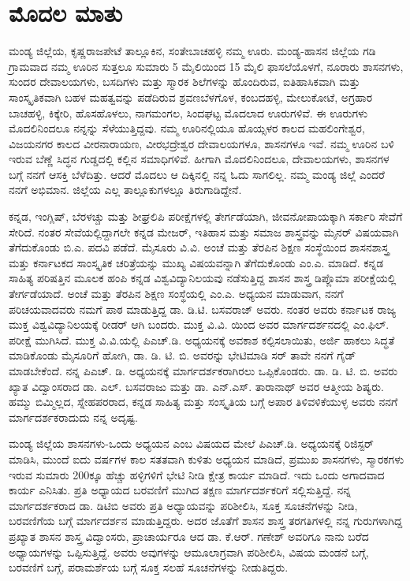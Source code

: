 
\chapter*{ಮೊದಲ ಮಾತು}

ಮಂಡ್ಯ ಜಿಲ್ಲೆಯ, ಕೃಷ್ಣರಾಜಪೇಟೆ ತಾಲ್ಲೂಕಿನ, ಸಂತೇಬಾಚಹಳ್ಳಿ ನಮ್ಮ ಊರು. ಮಂಡ್ಯ-ಹಾಸನ ಜಿಲ್ಲೆಯ ಗಡಿ ಗ್ರಾಮವಾದ ನಮ್ಮ ಊರಿನ ಸುತ್ತಲೂ ಸುಮಾರು 5 ಮೈಲಿಯಿಂದ 15 ಮೈಲಿ ಫಾಸಲೆಯೊಳಗೆ, ನೂರಾರು ಶಾಸನಗಳು, ಸುಂದರ ದೇವಾಲಯಗಳು, ಬಸದಿಗಳು ಮತ್ತು ಸ್ಮಾರಕ ಶಿಲೆಗಳನ್ನು ಹೊಂದಿರುವ, ಐತಿಹಾಸಿಕವಾಗಿ ಮತ್ತು ಸಾಂಸ್ಕೃತಿಕವಾಗಿ ಬಹಳ ಮಹತ್ವವನ್ನು ಪಡೆದಿರುವ ಶ್ರವಣಬೆಳಗೊಳ, ಕಂಬದಹಳ್ಳಿ, ಮೇಲುಕೋಟೆ, ಅಗ್ರಹಾರ ಬಾಚಹಳ್ಳಿ, ಕಿಕ್ಕೇರಿ, ಹೊಸಹೊಳಲು, ನಾಗಮಂಗಲ, ಸಿಂದಘಟ್ಟ ಮೊದಲಾದ ಊರುಗಳಿವೆ. ಈ ಊರುಗಳು ಮೊದಲಿನಿಂದಲೂ ನನ್ನನ್ನು ಸೆಳೆಯುತ್ತಿದ್ದವು. ನಮ್ಮ ಊರಿನಲ್ಲಿಯೂ ಹೊಯ್ಸಳರ ಕಾಲದ ಮಹಲಿಂಗೇಶ್ವರ, ವಿಜಯನಗರ ಕಾಲದ ವೀರನಾರಾಯಣ, ವೀರಭದ್ರೇಶ್ವರ ದೇವಾಲಯಗಳೂ, ಶಾಸನಗಳೂ ಇವೆ. ನಮ್ಮ ಊರಿನ ಬಳಿ ಇರುವ ಬೆಣ್ಣೆ ಸಿದ್ಧನ ಗುಡ್ಡದಲ್ಲಿ ಕಲ್ಲಿನ ಸಮಾಧಿಗಳಿವೆ. ಹೀಗಾಗಿ ಮೊದಲಿನಿಂದಲೂ, ದೇವಾಲಯಗಳು, ಶಾಸನಗಳ ಬಗ್ಗೆ ನನಗೆ ಆಸಕ್ತಿ ಬೆಳೆದಿತ್ತು. ಆದರೆ ಮೊದಲು ಆ ದಿಕ್ಕಿನಲ್ಲಿ ನನ್ನ ಓದು ಸಾಗಲಿಲ್ಲ. ನಮ್ಮ ಮಂಡ್ಯ ಜಿಲ್ಲೆ ಎಂದರೆ ನನಗೆ ಅಭಿಮಾನ. ಜಿಲ್ಲೆಯ ಎಲ್ಲ ತಾಲ್ಲೂಕುಗಳಲ್ಲೂ ತಿರುಗಾಡಿದ್ದೇನೆ.

ಕನ್ನಡ, ಇಂಗ್ಲಿಷ್​, ಬೆರಳಚ್ಚು ಮತ್ತು ಶೀಘ್ರಲಿಪಿ ಪರೀಕ್ಷೆಗಳಲ್ಲಿ ತೇರ್ಗಡೆಯಾಗಿ, ಜೀವನೋಪಾಯಕ್ಕಾಗಿ ಸರ್ಕಾರಿ ಸೇವೆಗೆ ಸೇರಿದೆ. ನಂತರ ಸೇವೆಯಲ್ಲಿದ್ದಾಗಲೇ ಕನ್ನಡ ಮೇಜರ್​, ಇತಿಹಾಸ ಮತ್ತು ಸಮಾಜ ಶಾಸ್ತ್ರವನ್ನು ಮೈನರ್​ ವಿಷಯವಾಗಿ ತೆಗೆದುಕೊಂಡು ಬಿ.ಎ. ಪದವಿ ಪಡೆದೆ. ಮೈಸೂರು ವಿ.ವಿ. ಅಂಚೆ ಮತ್ತು ತೆರಪಿನ ಶಿಕ್ಷಣ ಸಂಸ್ಥೆಯಿಂದ ಶಾಸನಶಾಸ್ತ್ರ ಮತ್ತು ಕರ್ನಾಟಕದ ಸಾಂಸ್ಕೃತಿಕ ಚರಿತ್ರೆಯನ್ನು ಮುಖ್ಯ ವಿಷಯವನ್ನಾಗಿ ತೆಗೆದುಕೊಂಡು ಎಂ.ಎ. ಮಾಡಿದೆ. ಕನ್ನಡ ಸಾಹಿತ್ಯ ಪರಿಷತ್ತಿನ ಮೂಲಕ ಹಂಪಿ ಕನ್ನಡ ವಿಶ್ವವಿದ್ಯಾನಿಲಯವು ನಡೆಸುತ್ತಿದ್ದ ಶಾಸನ ಶಾಸ್ತ್ರ ಡಿಪ್ಲೊಮಾ ಪರೀಕ್ಷೆಯಲ್ಲಿ ತೇರ್ಗಡೆಯಾದೆ. ಅಂಚೆ ಮತ್ತು ತೆರಪಿನ ಶಿಕ್ಷಣ ಸಂಸ್ಥೆಯಲ್ಲಿ ಎಂ.ಎ. ಅಧ್ಯಯನ ಮಾಡುವಾಗ, ನನಗೆ ಪರಿಚಯವಾದವರು ನಮಗೆ ಪಾಠ ಮಾಡುತ್ತಿದ್ದ ಡಾ. ಡಿ.ಟಿ. ಬಸವರಾಜ್​ ಅವರು. ನಂತರ ಅವರು ಕರ್ನಾಟಕ ರಾಜ್ಯ ಮುಕ್ತ ವಿಶ್ವವಿದ್ಯಾನಿಲಯಕ್ಕೆ ರೀಡರ್​ ಆಗಿ ಬಂದರು. ಮುಕ್ತ ವಿ.ವಿ. ಯಿಂದ ಅವರ ಮಾರ್ಗದರ್ಶನದಲ್ಲಿ ಎಂ.ಫಿಲ್​. ಪರೀಕ್ಷೆ ಮುಗಿಸಿದೆ. ಮುಕ್ತ ವಿ.ವಿ.ಯಲ್ಲಿ ಪಿಎಚ್​.ಡಿ. ಅಧ್ಯಯನಕ್ಕೆ ಅವಕಾಶ ಕಲ್ಪಿಸಲಾಯಿತು, ಅರ್ಜಿ ಹಾಕಲು ಸಿದ್ಧತೆ ಮಾಡಿಕೊಂಡು ಮೈಸೂರಿಗೆ ಹೋಗಿ, ಡಾ. ಡಿ. ಟಿ. ಬಿ. ಅವರನ್ನು ಭೇಟಿಮಾಡಿ ಸರ್​ ತಾವೇ ನನಗೆ ಗೈಡ್​ ಮಾಡಬೇಕೆಂದೆ. ನನ್ನ ಪಿಎಚ್. ಡಿ. ಅಧ್ಯಯನಕ್ಕೆ ಮಾರ್ಗದರ್ಶಕರಾಗಿರಲು ಒಪ್ಪಿಕೊಂಡರು. ಡಾ. ಡಿ. ಟಿ. ಬಿ. ಅವರು ಖ್ಯಾತ ವಿದ್ವಾಂಸರಾದ ಡಾ. ಎಲ್​. ಬಸವರಾಜು ಮತ್ತು ಡಾ. ಎನ್​.ಎಸ್​. ತಾರಾನಾಥ್​ ಅವರ ಆತ್ಮೀಯ ಶಿಷ್ಯರು. ಹಮ್ಮು ಬಿಮ್ಮಿಲ್ಲದ, ಸ್ನೇಹಪರರಾದ, ಕನ್ನಡ ಸಾಹಿತ್ಯ ಮತ್ತು ಸಂಸ್ಕೃತಿಯ ಬಗ್ಗೆ ಅಪಾರ ತಿಳಿವಳಿಕೆಯುಳ್ಳ ಅವರು ನನಗೆ ಮಾರ್ಗದರ್ಶಕರಾದುದು ನನ್ನ ಅದೃಷ್ಟ.

ಮಂಡ್ಯ ಜಿಲ್ಲೆಯ ಶಾಸನಗಳು-ಒಂದು ಅಧ್ಯಯನ ಎಂಬ ವಿಷಯದ ಮೇಲೆ ಪಿಎಚ್​.ಡಿ. ಅಧ್ಯಯನಕ್ಕೆ ರಿಜಿಸ್ಟರ್​ ಮಾಡಿಸಿ, ಮುಂದೆ ಐದು ವರ್ಷಗಳ ಕಾಲ ಸತತವಾಗಿ ಕುಳಿತು ಅಧ್ಯಯನ ಮಾಡಿದೆ, ಪ್ರಮುಖ ಶಾಸನಗಳು, ಸ್ಮಾರಕಗಳು ಇರುವ ಸುಮಾರು 200ಕ್ಕೂ ಹೆಚ್ಚು ಹಳ್ಳಿಗಳಿಗೆ ಭೇಟಿ ನೀಡಿ ಕ್ಷೇತ್ರ ಕಾರ್ಯ ಮಾಡಿದೆ. ಇದು ಒಂದು ಅಗಾದವಾದ ಕಾರ್ಯ ಎನಿಸಿತು. ಪ್ರತಿ ಅಧ್ಯಾಯದ ಬರವಣಿಗೆ ಮುಗಿದ ತಕ್ಷಣ ಮಾರ್ಗದರ್ಶಕರಿಗೆ ಸಲ್ಲಿಸುತ್ತಿದ್ದೆ. ನನ್ನ ಮಾರ್ಗದರ್ಶಕರಾದ ಡಾ. ಡಿಟಿಬಿ ಅವರು ಪ್ರತಿ ಅಧ್ಯಾಯವನ್ನು ಪರಿಶೀಲಿಸಿ, ಸೂಕ್ತ ಸೂಚನೆಗಳನ್ನು ನೀಡಿ, ಬರವಣಿಗೆಯ ಬಗ್ಗೆ ಮಾರ್ಗದರ್ಶನ ಮಾಡುತ್ತಿದ್ದರು. ಅದರ ಜೊತೆಗೆ ಶಾಸನ ಶಾಸ್ತ್ರ ತರಗತಿಗಳಲ್ಲಿ ನನ್ನ ಗುರುಗಳಾಗಿದ್ದ ಪ್ರಖ್ಯಾತ ಶಾಸನ ಶಾಸ್ತ್ರ ವಿದ್ವಾಂಸರು, ಪ್ರಾಚಾರ್ಯರೂ ಆದ ಡಾ. ಕೆ.ಆರ್​. ಗಣೇಶ್​ ಅವರಿಗೂ ನಾನು ಬರೆದ ಅಧ್ಯಾಯಗಳನ್ನು ಒಪ್ಪಿಸುತ್ತಿದ್ದೆ. ಅವರು ಅವುಗಳನ್ನು ಆಮೂಲಾಗ್ರವಾಗಿ ಪರಿಶೀಲಿಸಿ, ವಿಷಯ ಮಂಡನೆ ಬಗ್ಗೆ, ಬರವಣಿಗೆ ಬಗ್ಗೆ, ಪರಾಮರ್ಶೆಯ ಬಗ್ಗೆ ಸೂಕ್ತ ಸಲಹೆ ಸೂಚನೆಗಳನ್ನು ನೀಡುತಿದ್ದರು.

